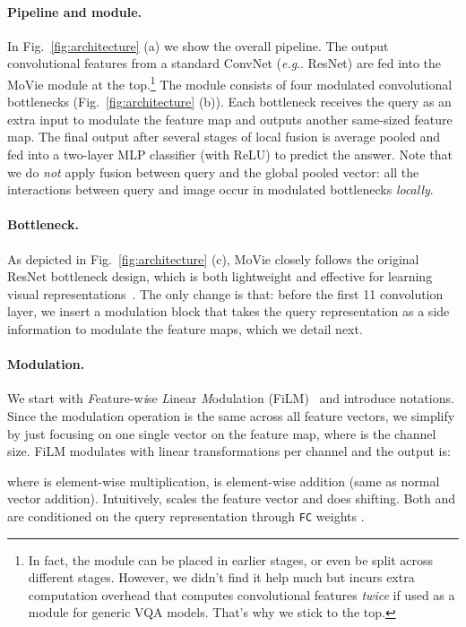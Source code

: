 \documentclass{article} \usepackage[dvipsnames,table]{xcolor}
\makeatletter
\newcommand{\ours}[0]{MoVie\xspace}
\def\x{\xspace}
\newcommand{\fc}{\texttt{FC}\xspace}
\DeclareRobustCommand\onedot{\futurelet\@let@token\@onedot}
\def\@onedot{\ifx\@let@token.\else.\null\fi\xspace}
\def\eg{\emph{e.g}\onedot} \def\Eg{\emph{E.g}\onedot}
\makeatother
\begin{document}
\paragraph{Pipeline and module.} In Fig.~\ref{fig:architecture} (a) we show the overall pipeline. The output convolutional features from a standard ConvNet (\eg ResNet) are fed into the \ours module at the top.\footnote{In fact, the module can be placed in earlier stages, or even be split across different stages. However, we didn't find it help much but incurs extra computation overhead that computes convolutional features \emph{twice} if used as a module for generic VQA models. That's why we stick to the top.} The module consists of four modulated convolutional bottlenecks (Fig.~\ref{fig:architecture} (b)). Each bottleneck receives the query as an extra input to modulate the feature map and outputs another same-sized feature map. The final output after several stages of local fusion is average pooled and fed into a two-layer MLP classifier (with ReLU) to predict the answer. Note that we do \emph{not} apply fusion between query and the global pooled vector: all the interactions between query and image occur in modulated bottlenecks \emph{locally}.

\paragraph{Bottleneck.} As depicted in Fig.~\ref{fig:architecture} (c), \ours closely follows the original ResNet bottleneck design, which is both lightweight and effective for learning visual representations~\cite{he2016deep}. The only change is that: before the first 1{\x}1 convolution layer, we insert a modulation block that takes the query representation as a side information to modulate the feature maps, which we detail next.

\paragraph{Modulation.} We start with \emph{F}eature-w\emph{i}se \emph{L}inear \emph{M}odulation (FiLM)~\cite{perez2018film} and introduce notations. Since the modulation operation is the same across all feature vectors, we simplify by just focusing on one single vector  on the feature map, where  is the channel size. FiLM modulates  with linear transformations per channel and the output  is:

where  is element-wise multiplication,  is element-wise addition (same as normal vector addition). Intuitively,  scales the feature vector and  does shifting. Both  and  are conditioned on the query representation  through \fc weights . 
\end{document}
